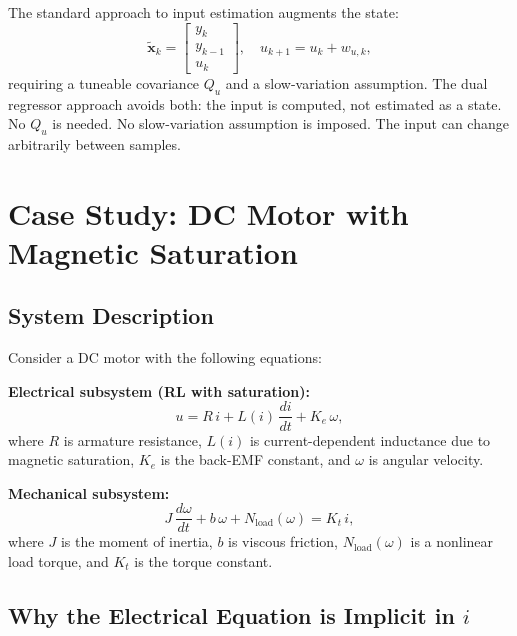 \documentclass[lettersize,journal]{IEEEtran}
\begin{document}
The standard approach to input estimation augments the state:
\begin{equation}
\label{eq:augmented}
\tilde{\mathbf{x}}_k = \begin{bmatrix} y_k \\ y_{k-1} \\ u_k \end{bmatrix}, \quad u_{k+1} = u_k + w_{u,k},
\end{equation}
requiring a tuneable covariance $Q_u$ and a slow-variation assumption. The dual regressor approach avoids both: the input is computed, not estimated as a state. No $Q_u$ is needed. No slow-variation assumption is imposed. The input can change arbitrarily between samples.

\section{Case Study: DC Motor with Magnetic Saturation}
\label{sec:case}

\subsection{System Description}

Consider a DC motor with the following equations:

\textbf{Electrical subsystem (RL with saturation):}
\begin{equation}
\label{eq:electrical}
u = R\,i + L(i)\,\frac{di}{dt} + K_e\,\omega,
\end{equation}
where $R$ is armature resistance, $L(i)$ is current-dependent inductance due to magnetic saturation, $K_e$ is the back-EMF constant, and $\omega$ is angular velocity.

\textbf{Mechanical subsystem:}
\begin{equation}
\label{eq:mechanical}
J\,\frac{d\omega}{dt} + b\,\omega + N_{\text{load}}(\omega) = K_t\,i,
\end{equation}
where $J$ is the moment of inertia, $b$ is viscous friction, $N_{\text{load}}(\omega)$ is a nonlinear load torque, and $K_t$ is the torque constant.

\subsection{Why the Electrical Equation is Implicit in $i$}
\end{document}
